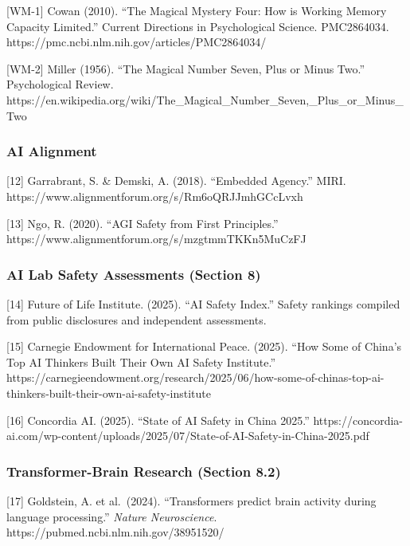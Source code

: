 \documentclass[
]{article}
\begin{document}
{[}WM-1{]} Cowan (2010). ``The Magical Mystery Four: How is Working
Memory Capacity Limited.'' Current Directions in Psychological Science.
PMC2864034. https://pmc.ncbi.nlm.nih.gov/articles/PMC2864034/

{[}WM-2{]} Miller (1956). ``The Magical Number Seven, Plus or Minus
Two.'' Psychological Review.
https://en.wikipedia.org/wiki/The\_Magical\_Number\_Seven,\_Plus\_or\_Minus\_Two

\hypertarget{ai-alignment}{%
\subsubsection{AI Alignment}\label{ai-alignment}}

{[}12{]} Garrabrant, S. \& Demski, A. (2018). ``Embedded Agency.'' MIRI.
https://www.alignmentforum.org/s/Rm6oQRJJmhGCcLvxh

{[}13{]} Ngo, R. (2020). ``AGI Safety from First Principles.''
https://www.alignmentforum.org/s/mzgtmmTKKn5MuCzFJ

\hypertarget{ai-lab-safety-assessments-section-8}{%
\subsubsection{AI Lab Safety Assessments (Section
8)}\label{ai-lab-safety-assessments-section-8}}

{[}14{]} Future of Life Institute. (2025). ``AI Safety Index.'' Safety
rankings compiled from public disclosures and independent assessments.

{[}15{]} Carnegie Endowment for International Peace. (2025). ``How Some
of China's Top AI Thinkers Built Their Own AI Safety Institute.''
https://carnegieendowment.org/research/2025/06/how-some-of-chinas-top-ai-thinkers-built-their-own-ai-safety-institute

{[}16{]} Concordia AI. (2025). ``State of AI Safety in China 2025.''
https://concordia-ai.com/wp-content/uploads/2025/07/State-of-AI-Safety-in-China-2025.pdf

\hypertarget{transformer-brain-research-section-8.2}{%
\subsubsection{Transformer-Brain Research (Section
8.2)}\label{transformer-brain-research-section-8.2}}

{[}17{]} Goldstein, A. et al.~(2024). ``Transformers predict brain
activity during language processing.'' \emph{Nature Neuroscience}.
https://pubmed.ncbi.nlm.nih.gov/38951520/
\end{document}
